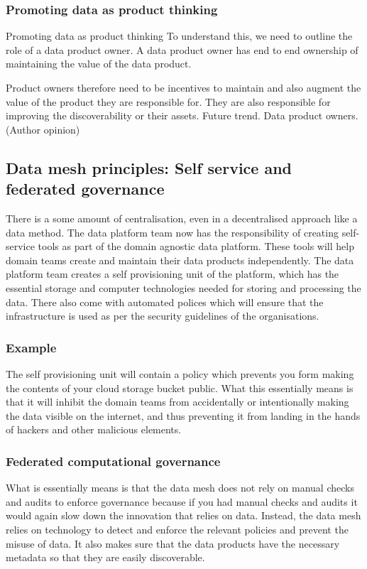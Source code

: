 \documentclass[a4paper, 11pt]{book}
\begin{document}
    \subsubsection{Promoting data as product thinking}
    Promoting data as product thinking
    To understand this, we need to outline the role of a data product owner.
    A data product owner has end to end ownership of maintaining the value of the data product.

    Product owners therefore need to be incentives to maintain and also augment the value of the product they are responsible for.
    They are also responsible for improving the discoverability or their assets.
    Future trend. Data product owners. (Author opinion)

    \subsection{Data mesh principles: Self service and federated governance}
    There is a some amount of centralisation, even in a decentralised approach like a data method.
    The data platform team now has the responsibility of creating self-service tools as part of the domain agnostic data platform.
    These tools will help domain teams create and maintain their data products independently.
    The data platform team creates a self provisioning unit of the platform, which has the essential storage and computer technologies needed for storing and processing the data.
    There also come with automated polices which will ensure that the infrastructure is used as per the security guidelines of the organisations.

    \subsubsection{Example}
    The self provisioning unit will contain a policy which prevents you form making the contents of your cloud storage bucket public.
    What this essentially means is that it will inhibit the domain teams from accidentally or intentionally making the data visible on the internet, and thus preventing it from landing in the hands of hackers and other malicious elements.

    \subsubsection{Federated computational governance}
    What is essentially means is that the data mesh does not rely on manual checks and audits to enforce governance because if you had manual checks and audits it would again slow down the innovation that relies on data.
    Instead, the data mesh relies on technology to detect and enforce the relevant policies and prevent the misuse of data.
    It also makes sure that the data products have the necessary metadata so that they are easily discoverable.
\end{document}
